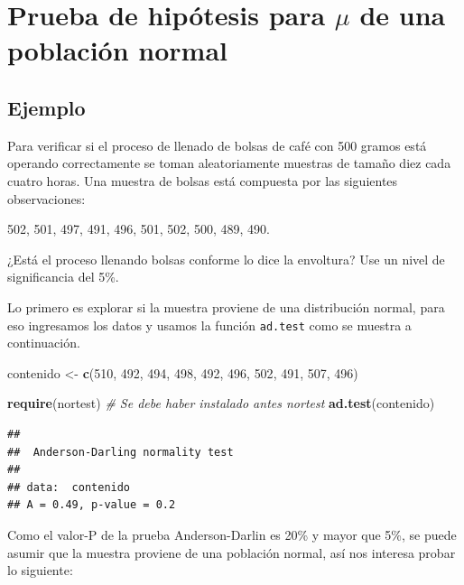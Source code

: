 \documentclass[10pt,]{krantz}
\makeatletter
\newenvironment{Shaded}{\begin{snugshade}}{\end{snugshade}}
\newcommand{\KeywordTok}[1]{\textcolor[rgb]{0.13,0.29,0.53}{\textbf{{#1}}}}
\newcommand{\DecValTok}[1]{\textcolor[rgb]{0.00,0.00,0.81}{{#1}}}
\newcommand{\StringTok}[1]{\textcolor[rgb]{0.31,0.60,0.02}{{#1}}}
\newcommand{\CommentTok}[1]{\textcolor[rgb]{0.56,0.35,0.01}{\textit{{#1}}}}
\newcommand{\NormalTok}[1]{{#1}}
\newenvironment{kframe}{%
\medskip{}
\setlength{\fboxsep}{.8em}
 \def\at@end@of@kframe{}%
 \ifinner\ifhmode%
  \def\at@end@of@kframe{\end{minipage}}%
  \begin{minipage}{\columnwidth}%
 \fi\fi%
 \def\FrameCommand##1{\hskip\@totalleftmargin \hskip-\fboxsep
 \colorbox{shadecolor}{##1}\hskip-\fboxsep
     \hskip-\linewidth \hskip-\@totalleftmargin \hskip\columnwidth}%
 \MakeFramed {\advance\hsize-\width
   \@totalleftmargin\z@ \linewidth\hsize
   \@setminipage}}%
 {\par\unskip\endMakeFramed%
 \at@end@of@kframe}
\renewenvironment{Shaded}{\begin{kframe}}{\end{kframe}}
\makeatother
\begin{document}
\section{\texorpdfstring{Prueba de hipótesis para \(\mu\) de una
población
normal}{Prueba de hipótesis para \textbackslash{}mu de una población normal}}\label{prueba-de-hipotesis-para-mu-de-una-poblacion-normal}

\subsection*{Ejemplo}\label{ejemplo-61}


Para verificar si el proceso de llenado de bolsas de café con 500 gramos
está operando correctamente se toman aleatoriamente muestras de tamaño
diez cada cuatro horas. Una muestra de bolsas está compuesta por las
siguientes observaciones:

502, 501, 497, 491, 496, 501, 502, 500, 489, 490.

¿Está el proceso llenando bolsas conforme lo dice la envoltura? Use un
nivel de significancia del 5\%.

Lo primero es explorar si la muestra proviene de una distribución
normal, para eso ingresamos los datos y usamos la función
\texttt{ad.test} como se muestra a continuación.

\begin{Shaded}
\begin{Highlighting}[]
\NormalTok{contenido <-}\StringTok{ }\KeywordTok{c}\NormalTok{(}\DecValTok{510}\NormalTok{, }\DecValTok{492}\NormalTok{, }\DecValTok{494}\NormalTok{, }\DecValTok{498}\NormalTok{, }\DecValTok{492}\NormalTok{,}
               \DecValTok{496}\NormalTok{, }\DecValTok{502}\NormalTok{, }\DecValTok{491}\NormalTok{, }\DecValTok{507}\NormalTok{, }\DecValTok{496}\NormalTok{) }

\KeywordTok{require}\NormalTok{(nortest) }\CommentTok{# Se debe haber instalado antes nortest}
\KeywordTok{ad.test}\NormalTok{(contenido)}
\end{Highlighting}
\end{Shaded}

\begin{verbatim}
## 
##  Anderson-Darling normality test
## 
## data:  contenido
## A = 0.49, p-value = 0.2
\end{verbatim}

Como el valor-P de la prueba Anderson-Darlin es 20\% y mayor que 5\%, se
puede asumir que la muestra proviene de una población normal, así nos
interesa probar lo siguiente:
\end{document}
